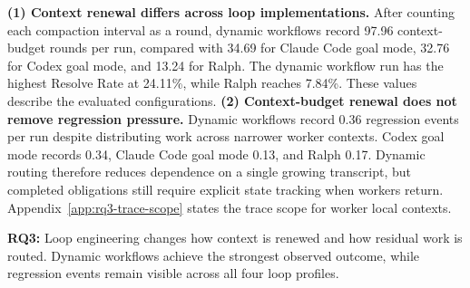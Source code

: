 

\textbf{(1) Context renewal differs across loop implementations.}
After counting each compaction interval as a round, dynamic workflows record 97.96 context-budget rounds per run, compared with 34.69 for Claude Code goal mode, 32.76 for Codex goal mode, and 13.24 for Ralph. The dynamic workflow run has the highest Resolve Rate at 24.11\%, while Ralph reaches 7.84\%. These values describe the evaluated configurations.
\textbf{(2) Context-budget renewal does not remove regression pressure.}
Dynamic workflows record 0.36 regression events per run despite distributing work across narrower worker contexts. Codex goal mode records 0.34, Claude Code goal mode 0.13, and Ralph 0.17. Dynamic routing therefore reduces dependence on a single growing transcript, but completed obligations still require explicit state tracking when workers return. Appendix~\ref{app:rq3-trace-scope} states the trace scope for worker local contexts.
\begin{summary}
\textbf{RQ3:} Loop engineering changes how context is renewed and how residual work is routed. Dynamic workflows achieve the strongest observed outcome, while regression events remain visible across all four loop profiles.
\end{summary}
